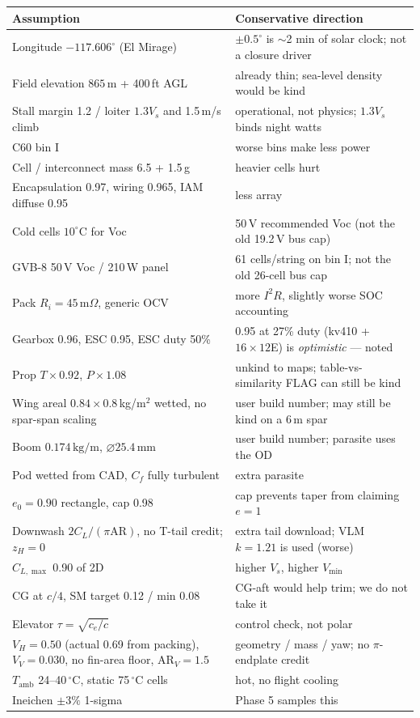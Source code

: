 \documentclass[11pt,letterpaper]{article}
\begin{document}
\begin{center}
\begin{tabular}{@{}p{}p{}@{}}
\toprule
Assumption & Conservative direction \\
\midrule
Longitude $-117.606^\circ$ (El Mirage) & $\pm 0.5^\circ$ is $\sim$2 min of solar clock; not a closure driver \\
Field elevation $865\,\mathrm{m}$ + 400\,ft AGL & already thin; sea-level density would be kind \\
Stall margin 1.2 / loiter $1.3 V_s$ and 1.5\,m/s climb & operational, not physics; $1.3 V_s$ binds night watts \\
C60 bin I & worse bins make less power \\
Cell / interconnect mass 6.5 + 1.5\,g & heavier cells hurt \\
Encapsulation 0.97, wiring 0.965, IAM diffuse 0.95 & less array \\
Cold cells $10^\circ\mathrm{C}$ for Voc & 50\,V recommended Voc (not the old 19.2\,V bus cap) \\
GVB-8 50\,V Voc / 210\,W panel & 61 cells/string on bin I; not the old 26-cell bus cap \\
Pack $R_i = 45\,\mathrm{m}\Omega$, generic OCV & more $I^2R$, slightly worse SOC accounting \\
Gearbox 0.96, ESC 0.95, ESC duty 50\% & 0.95 at 27\% duty (kv410 + $16\times12$E) is \emph{optimistic} --- noted \\
Prop $T\times 0.92$, $P\times 1.08$ & unkind to maps; table-vs-similarity FLAG can still be kind \\
Wing areal $0.84\times 0.8$\,kg/m$^2$ wetted, no spar-span scaling & user build number; may still be kind on a 6\,m spar \\
Boom $0.174\,\mathrm{kg/m}$, $\varnothing 25.4\,\mathrm{mm}$ & user build number; parasite uses the OD \\
Pod wetted from CAD, $C_f$ fully turbulent & extra parasite \\
$e_0 = 0.90$ rectangle, cap 0.98 & cap prevents taper from claiming $e=1$ \\
Downwash $2C_L/(\pi\mathrm{AR})$, no T-tail credit; $z_H=0$ & extra tail download; VLM $k=1.21$ is used (worse) \\
$C_{L,\max}$ 0.90 of 2D & higher $V_s$, higher $V_{\min}$ \\
CG at $c/4$, SM target 0.12 / min 0.08 & CG-aft would help trim; we do not take it \\
Elevator $\tau=\sqrt{c_e/c}$ & control check, not polar \\
$V_H=0.50$ (actual 0.69 from packing), $V_V=0.030$, no fin-area floor, $\mathrm{AR}_V=1.5$ & geometry / mass / yaw; no $\pi$-endplate credit \\
$T_\mathrm{amb}$ 24--40\,$^\circ\mathrm{C}$, static 75\,$^\circ\mathrm{C}$ cells & hot, no flight cooling \\
Ineichen $\pm 3\%$ 1-sigma & Phase 5 samples this \\
\bottomrule
\end{tabular}
\end{center}
\end{document}
